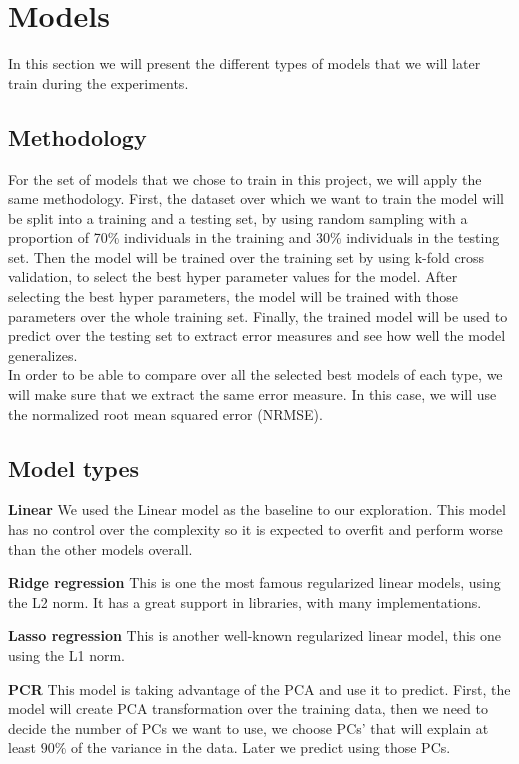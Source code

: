 \section{Models}

In this section we will present the different types of models that we will later train during the experiments. 

\subsection{Methodology}
For the set of models that we chose to train in this project, we will apply the same methodology. First, the dataset over which we want to train the model will be split into a training and a testing set, by using random sampling with a proportion of 70\% individuals in the training and 30\% individuals in the testing set. Then the model will be trained over the training set by using k-fold cross validation, to select the best hyper parameter values for the model. After selecting the best hyper parameters, the model will be trained with those parameters over the whole training set. Finally, the trained model will be used to predict over the testing set to extract error measures and see how well the model generalizes.\\
In order to be able to compare over all the selected best models of each type, we will make sure that we extract the same error measure. In this case, we will use the normalized root mean squared error (NRMSE).

\subsection{Model types}
\textbf{Linear} We used the Linear model as the baseline to our exploration. This model has no control over the complexity so it is expected to overfit and perform worse than the other models overall.

\textbf{Ridge regression} This is one the most famous regularized linear models, using the L2 norm. It has a great support in libraries, with many implementations.

\textbf{Lasso regression}
This is another well-known regularized linear model, this one using the L1 norm. 

\textbf{PCR} This model is taking advantage of the PCA and use it to predict. First, the model will create PCA transformation over the training data, then we need to decide the number of PCs we want to use, we choose PCs' that will explain at least $90\%$ of the variance in the data. Later we predict using those PCs.

